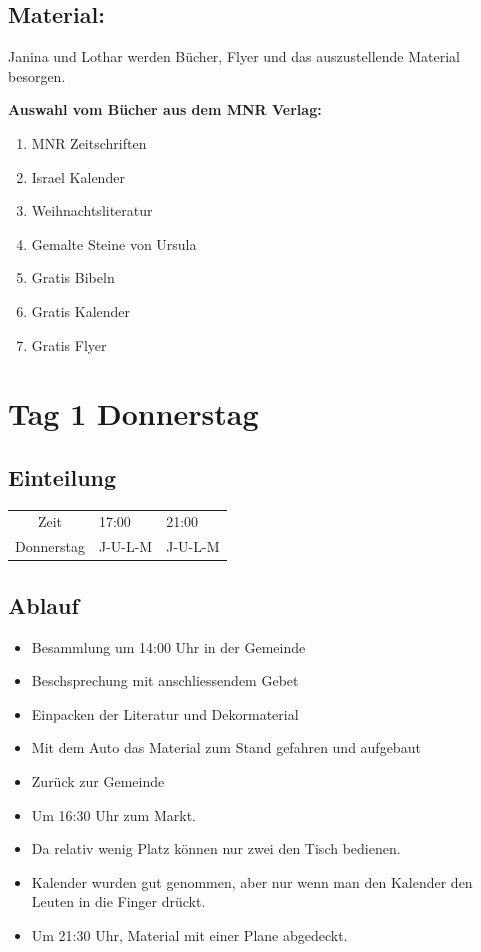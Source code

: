 \documentclass{mybib}
\begin{document}
\subsection{Material:}
Janina und Lothar werden Bücher, Flyer und das auszustellende Material besorgen.

\textbf{Auswahl vom Bücher aus dem MNR Verlag:}
\begin{enumerate}  
  \item MNR Zeitschriften
  \item Israel Kalender
  \item Weihnachtsliteratur
  \item Gemalte Steine von Ursula
  \item Gratis Bibeln
  \item Gratis Kalender
  \item Gratis Flyer
\end{enumerate}

\section{Tag 1 Donnerstag}
\subsection{Einteilung}
\begin{center}
\begin{tabular}{ c | l l }
  Zeit & 17:00 & 21:00\\
  Donnerstag & J-U-L-M & J-U-L-M 
\end{tabular}
\end{center}
\subsection{Ablauf}
\begin{itemize}
  \item Besammlung um 14:00 Uhr in der Gemeinde
  \item Beschsprechung mit anschliessendem Gebet
  \item Einpacken der Literatur und Dekormaterial
  \item Mit dem Auto das Material zum Stand gefahren und aufgebaut
  \item Zurück zur Gemeinde
  \item Um 16:30 Uhr zum Markt.
  \item Da relativ wenig Platz können nur zwei den Tisch bedienen.
  \item Kalender wurden gut genommen, aber nur wenn man den Kalender den Leuten in die Finger drückt.
  \item Um 21:30 Uhr, Material mit einer Plane abgedeckt.
\end{itemize}
\end{document}
